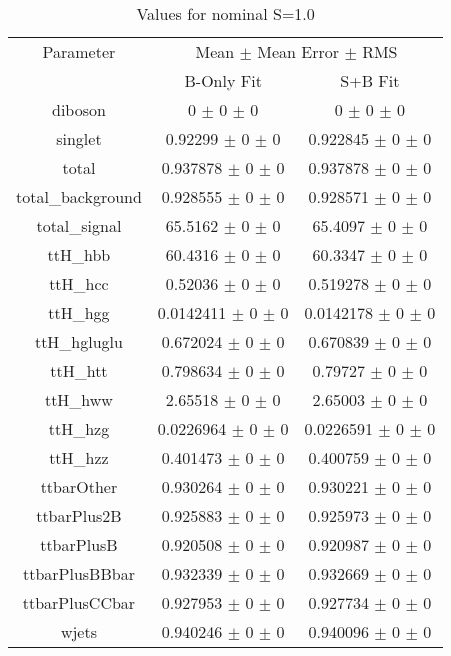 \begin{table}
\centering
\caption{Values for nominal S=1.0}
\begin{tabular}{ccc}
\toprule
Parameter 	& \multicolumn{2}{c}{Mean $\pm$ Mean Error $\pm$ RMS}\\
 	& B-Only Fit & S+B Fit\\
\midrule
diboson 	& \num{0} $\pm$ \num{0} $\pm$ \num{0} 	& \num{0} $\pm$ \num{0} $\pm$ \num{0}\\
singlet 	& \num{0.92299} $\pm$ \num{0} $\pm$ \num{0} 	& \num{0.922845} $\pm$ \num{0} $\pm$ \num{0}\\
total 	& \num{0.937878} $\pm$ \num{0} $\pm$ \num{0} 	& \num{0.937878} $\pm$ \num{0} $\pm$ \num{0}\\
total\_background 	& \num{0.928555} $\pm$ \num{0} $\pm$ \num{0} 	& \num{0.928571} $\pm$ \num{0} $\pm$ \num{0}\\
total\_signal 	& \num{65.5162} $\pm$ \num{0} $\pm$ \num{0} 	& \num{65.4097} $\pm$ \num{0} $\pm$ \num{0}\\
ttH\_hbb 	& \num{60.4316} $\pm$ \num{0} $\pm$ \num{0} 	& \num{60.3347} $\pm$ \num{0} $\pm$ \num{0}\\
ttH\_hcc 	& \num{0.52036} $\pm$ \num{0} $\pm$ \num{0} 	& \num{0.519278} $\pm$ \num{0} $\pm$ \num{0}\\
ttH\_hgg 	& \num{0.0142411} $\pm$ \num{0} $\pm$ \num{0} 	& \num{0.0142178} $\pm$ \num{0} $\pm$ \num{0}\\
ttH\_hgluglu 	& \num{0.672024} $\pm$ \num{0} $\pm$ \num{0} 	& \num{0.670839} $\pm$ \num{0} $\pm$ \num{0}\\
ttH\_htt 	& \num{0.798634} $\pm$ \num{0} $\pm$ \num{0} 	& \num{0.79727} $\pm$ \num{0} $\pm$ \num{0}\\
ttH\_hww 	& \num{2.65518} $\pm$ \num{0} $\pm$ \num{0} 	& \num{2.65003} $\pm$ \num{0} $\pm$ \num{0}\\
ttH\_hzg 	& \num{0.0226964} $\pm$ \num{0} $\pm$ \num{0} 	& \num{0.0226591} $\pm$ \num{0} $\pm$ \num{0}\\
ttH\_hzz 	& \num{0.401473} $\pm$ \num{0} $\pm$ \num{0} 	& \num{0.400759} $\pm$ \num{0} $\pm$ \num{0}\\
ttbarOther 	& \num{0.930264} $\pm$ \num{0} $\pm$ \num{0} 	& \num{0.930221} $\pm$ \num{0} $\pm$ \num{0}\\
ttbarPlus2B 	& \num{0.925883} $\pm$ \num{0} $\pm$ \num{0} 	& \num{0.925973} $\pm$ \num{0} $\pm$ \num{0}\\
ttbarPlusB 	& \num{0.920508} $\pm$ \num{0} $\pm$ \num{0} 	& \num{0.920987} $\pm$ \num{0} $\pm$ \num{0}\\
ttbarPlusBBbar 	& \num{0.932339} $\pm$ \num{0} $\pm$ \num{0} 	& \num{0.932669} $\pm$ \num{0} $\pm$ \num{0}\\
ttbarPlusCCbar 	& \num{0.927953} $\pm$ \num{0} $\pm$ \num{0} 	& \num{0.927734} $\pm$ \num{0} $\pm$ \num{0}\\
wjets 	& \num{0.940246} $\pm$ \num{0} $\pm$ \num{0} 	& \num{0.940096} $\pm$ \num{0} $\pm$ \num{0}\\
\bottomrule
\end{tabular}
\end{table}
